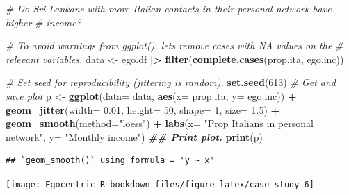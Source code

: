 \documentclass[
]{book}
\newenvironment{Shaded}{\begin{snugshade}}{\end{snugshade}}
\newcommand{\AttributeTok}[1]{\textcolor[rgb]{0.13,0.29,0.53}{#1}}
\newcommand{\CommentTok}[1]{\textcolor[rgb]{0.56,0.35,0.01}{\textit{#1}}}
\newcommand{\DecValTok}[1]{\textcolor[rgb]{0.00,0.00,0.81}{#1}}
\newcommand{\DocumentationTok}[1]{\textcolor[rgb]{0.56,0.35,0.01}{\textbf{\textit{#1}}}}
\newcommand{\FloatTok}[1]{\textcolor[rgb]{0.00,0.00,0.81}{#1}}
\newcommand{\FunctionTok}[1]{\textcolor[rgb]{0.13,0.29,0.53}{\textbf{#1}}}
\newcommand{\NormalTok}[1]{#1}
\newcommand{\OtherTok}[1]{\textcolor[rgb]{0.56,0.35,0.01}{#1}}
\newcommand{\SpecialCharTok}[1]{\textcolor[rgb]{0.81,0.36,0.00}{\textbf{#1}}}
\newcommand{\StringTok}[1]{\textcolor[rgb]{0.31,0.60,0.02}{#1}}
\begin{document}
\begin{Shaded}
\begin{Highlighting}[]
\CommentTok{\# Do Sri Lankans with more Italian contacts in their personal network have higher}
\CommentTok{\# income?}

\CommentTok{\# To avoid warnings from ggplot(), let\textquotesingle{}s remove cases with NA values on the}
\CommentTok{\# relevant variables.}
\NormalTok{data }\OtherTok{\textless{}{-}}\NormalTok{ ego.df }\SpecialCharTok{|\textgreater{}}
  \FunctionTok{filter}\NormalTok{(}\FunctionTok{complete.cases}\NormalTok{(prop.ita, ego.inc))}

\CommentTok{\# Set seed for reproducibility (jittering is random).}
\FunctionTok{set.seed}\NormalTok{(}\DecValTok{613}\NormalTok{)}
\CommentTok{\# Get and save plot}
\NormalTok{p }\OtherTok{\textless{}{-}} \FunctionTok{ggplot}\NormalTok{(}\AttributeTok{data=}\NormalTok{ data, }\FunctionTok{aes}\NormalTok{(}\AttributeTok{x=}\NormalTok{ prop.ita, }\AttributeTok{y=}\NormalTok{ ego.inc)) }\SpecialCharTok{+} 
  \FunctionTok{geom\_jitter}\NormalTok{(}\AttributeTok{width=} \FloatTok{0.01}\NormalTok{, }\AttributeTok{height=} \DecValTok{50}\NormalTok{, }\AttributeTok{shape=} \DecValTok{1}\NormalTok{, }\AttributeTok{size=} \FloatTok{1.5}\NormalTok{) }\SpecialCharTok{+} 
  \FunctionTok{geom\_smooth}\NormalTok{(}\AttributeTok{method=}\StringTok{"loess"}\NormalTok{) }\SpecialCharTok{+} 
  \FunctionTok{labs}\NormalTok{(}\AttributeTok{x=} \StringTok{"Prop Italians in personal network"}\NormalTok{, }\AttributeTok{y=} \StringTok{"Monthly income"}\NormalTok{)}
\DocumentationTok{\#\# Print plot.}
\FunctionTok{print}\NormalTok{(p)}
\end{Highlighting}
\end{Shaded}

\begin{verbatim}
## `geom_smooth()` using formula = 'y ~ x'
\end{verbatim}

\texttt{[image: Egocentric\_R\_bookdown\_files/figure-latex/case-study-6]}

  
\end{document}
